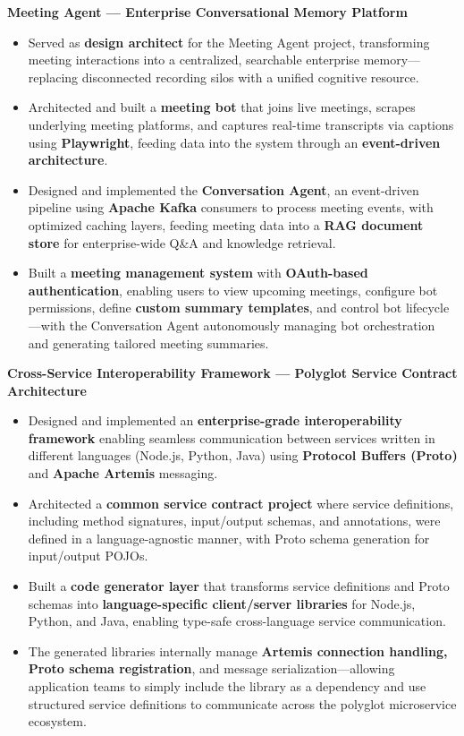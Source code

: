 \documentclass[a4paper,11pt]{article}
\begin{document}
\vspace{4pt}
\textbf{Meeting Agent --- Enterprise Conversational Memory Platform}
\begin{itemize}[leftmargin=*, nosep]
  \item Served as \textbf{design architect} for the Meeting Agent project, transforming meeting interactions into a centralized, searchable enterprise memory---replacing disconnected recording silos with a unified cognitive resource.
  \item Architected and built a \textbf{meeting bot} that joins live meetings, scrapes underlying meeting platforms, and captures real-time transcripts via captions using \textbf{Playwright}, feeding data into the system through an \textbf{event-driven architecture}.
  \item Designed and implemented the \textbf{Conversation Agent}, an event-driven pipeline using \textbf{Apache Kafka} consumers to process meeting events, with optimized caching layers, feeding meeting data into a \textbf{RAG document store} for enterprise-wide Q\&A and knowledge retrieval.
  \item Built a \textbf{meeting management system} with \textbf{OAuth-based authentication}, enabling users to view upcoming meetings, configure bot permissions, define \textbf{custom summary templates}, and control bot lifecycle---with the Conversation Agent autonomously managing bot orchestration and generating tailored meeting summaries.
\end{itemize}

\vspace{4pt}
\textbf{Cross-Service Interoperability Framework --- Polyglot Service Contract Architecture}
\begin{itemize}[leftmargin=*, nosep]
  \item Designed and implemented an \textbf{enterprise-grade interoperability framework} enabling seamless communication between services written in different languages (Node.js, Python, Java) using \textbf{Protocol Buffers (Proto)} and \textbf{Apache Artemis} messaging.
  \item Architected a \textbf{common service contract project} where service definitions, including method signatures, input/output schemas, and annotations, were defined in a language-agnostic manner, with Proto schema generation for input/output POJOs.
  \item Built a \textbf{code generator layer} that transforms service definitions and Proto schemas into \textbf{language-specific client/server libraries} for Node.js, Python, and Java, enabling type-safe cross-language service communication.
  \item The generated libraries internally manage \textbf{Artemis connection handling, Proto schema registration}, and message serialization---allowing application teams to simply include the library as a dependency and use structured service definitions to communicate across the polyglot microservice ecosystem.
\end{itemize}
\end{document}
